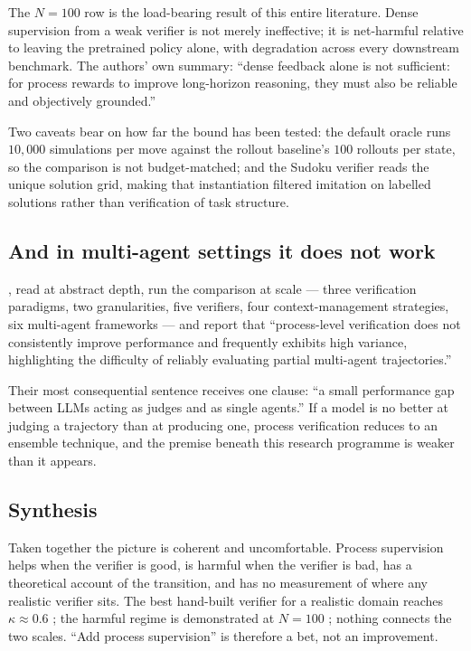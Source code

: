 \documentclass[10pt,twocolumn,a4paper]{article}
\begin{document}
The $N = 100$ row is the load-bearing result of this entire literature.
Dense supervision from a weak verifier is not merely ineffective; it is net-harmful
relative to leaving the pretrained policy alone, with degradation across every downstream
benchmark.
The authors' own summary: ``dense feedback alone is not sufficient: for process rewards to
improve long-horizon reasoning, they must also be reliable and objectively grounded.''

Two caveats bear on how far the bound has been tested: the default oracle runs $10{,}000$
simulations per move against the rollout baseline's $100$ rollouts per state, so the
comparison is not budget-matched; and the Sudoku verifier reads the unique solution grid,
making that instantiation filtered imitation on labelled solutions rather than verification
of task structure.

\subsection{And in multi-agent settings it does not work}

\citet{venkataramani2026masproveunderstandingprocessverification}, read at abstract depth,
run the comparison at scale --- three verification paradigms, two granularities, five
verifiers, four context-management strategies, six multi-agent frameworks --- and report
that ``process-level verification does not consistently improve performance and frequently
exhibits high variance, highlighting the difficulty of reliably evaluating partial
multi-agent trajectories.''

Their most consequential sentence receives one clause: ``a small performance gap between
LLMs acting as judges and as single agents.''
If a model is no better at judging a trajectory than at producing one, process verification
reduces to an ensemble technique, and the premise beneath this research programme is weaker
than it appears.

\subsection{Synthesis}

Taken together the picture is coherent and uncomfortable.
Process supervision helps when the verifier is good, is harmful when the verifier is bad,
has a theoretical account of the transition, and has no measurement of where any realistic
verifier sits.
The best hand-built verifier for a realistic domain reaches $\kappa \approx 0.6$
\citep{rosset2026artbuildingverifierscomputer}; the harmful regime is demonstrated at
$N=100$ \citep{yuan2026verifiableprocessrewardsagentic}; nothing connects the two scales.
``Add process supervision'' is therefore a bet, not an improvement.
\end{document}
